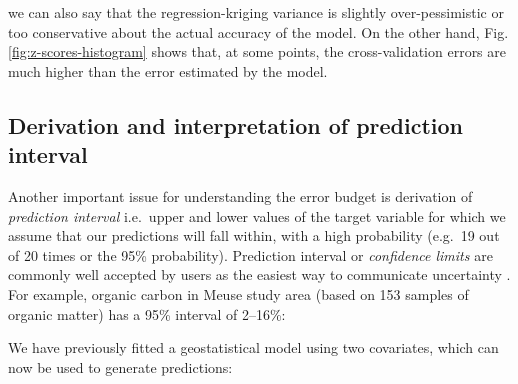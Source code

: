 \documentclass[11pt]{krantz}
\newenvironment{Shaded}{\begin{snugshade}}{\end{snugshade}}
\newcommand{\CommentTok}[1]{\textcolor[rgb]{0.37,0.37,0.37}{\textit{#1}}}
\newcommand{\DataTypeTok}[1]{\textcolor[rgb]{0.27,0.27,0.27}{#1}}
\newcommand{\DecValTok}[1]{\textcolor[rgb]{0.06,0.06,0.06}{#1}}
\newcommand{\FloatTok}[1]{\textcolor[rgb]{0.06,0.06,0.06}{#1}}
\newcommand{\KeywordTok}[1]{\textcolor[rgb]{0.27,0.27,0.27}{\textbf{#1}}}
\newcommand{\NormalTok}[1]{#1}
\newcommand{\OperatorTok}[1]{\textcolor[rgb]{0.43,0.43,0.43}{\textbf{#1}}}
\newcommand{\OtherTok}[1]{\textcolor[rgb]{0.37,0.37,0.37}{#1}}
\newcommand{\StringTok}[1]{\textcolor[rgb]{0.5,0.5,0.5}{#1}}
\theoremstyle{definition}
\theoremstyle{definition}
\theoremstyle{definition}
\theoremstyle{remark}
\begin{document}
\begin{Shaded}
\end{Shaded}

we can also say that the regression-kriging variance is slightly
over-pessimistic or too conservative about the actual accuracy of the
model. On the other hand, Fig. \ref{fig:z-scores-histogram} shows that,
at some points, the cross-validation errors are much higher than the
error estimated by the model.

\hypertarget{derivation-and-interpretation-of-prediction-interval}{%
\subsection{Derivation and interpretation of prediction
interval}\label{derivation-and-interpretation-of-prediction-interval}}

Another important issue for understanding the error budget is derivation
of \emph{prediction interval} i.e.~upper and lower values of the target
variable for which we assume that our predictions will fall within, with
a high probability (e.g.~19 out of 20 times or the 95\% probability).
Prediction interval or \emph{confidence limits} are commonly well
accepted by users as the easiest way to communicate uncertainty
\citep{brodlie2012review}. For example, organic carbon in Meuse study
area (based on 153 samples of organic matter) has a 95\% interval of
2--16\%:

\begin{Shaded}
\end{Shaded}

We have previously fitted a geostatistical model using two covariates,
which can now be used to generate predictions:

\begin{Shaded}
\end{Shaded}
\end{document}
